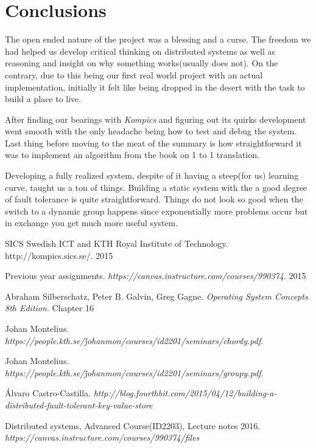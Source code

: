 \documentclass[a4paper, 11pt]{article}
\begin{document}
\section{Conclusions}

The open ended nature of the project was a blessing and a curse. The freedom we had helped us develop critical thinking on distributed systems as well as reasoning and insight on why something works(usually does not). On the contrary, due to  this being our first real world project with an actual implementation, initially it felt like being dropped in the desert with the task to build a place to live. \par

After finding our bearings with \textit{Kompics} and figuring out its quirks development went smooth with the only headache being how to test and debug the system. Last thing before moving to the meat of the summary is how straightforward it was to implement an algorithm from the book on 1 to 1 translation. \par

Developing a fully realized system, despite of it having a steep(for us) learning curve, taught us a ton of things. Building a static system with the a good degree of fault tolerance is quite straightforward. Things do not look so good when the switch to a dynamic group happens since exponentially more problems occur but in exchange you get much more useful system. \par

\clearpage

\begin{thebibliography}{9}
	 SICS Swedish ICT and KTH Royal Institute of Technology.  http://kompics.sics.se/. 2015
	
	 Previous year assignments. \textit{https://canvas.instructure.com/courses/990374}. 2015
	
	  Abraham Silberschatz, Peter B. Galvin, Greg Gagne. \textit{Operating System Concepts 8th Edition}. Chapter 16 
	
	 Johan Montelius. \textit{https://people.kth.se/\~johanmon/courses/id2201/seminars/chordy.pdf}.
	
	 Johan Montelius. \textit{https://people.kth.se/\~johanmon/courses/id2201/seminars/groupy.pdf}.
	
	 Álvaro Castro-Castilla. \textit{	http://blog.fourthbit.com/2015/04/12/building-a-distributed-fault-tolerant-key-value-store}
	
	 Distributed systems, Advanced Course(ID2203), Lecture notes 2016. \textit{https://canvas.instructure.com/courses/990374/files}
	
\end{thebibliography}
\end{document}
